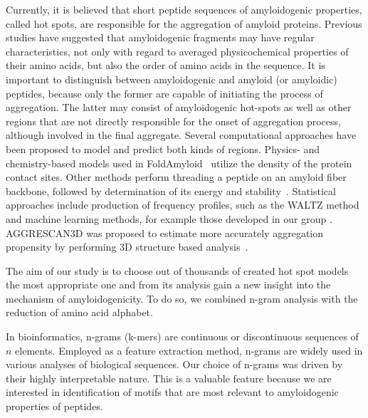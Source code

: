 \documentclass[fleqn,10pt,twoside]{gcb15submission}
\begin{document}
  Currently, it is believed that short peptide sequences of amyloidogenic 
properties, called hot spots, are responsible for the aggregation of amyloid 
proteins. Previous studies have suggested that amyloidogenic fragments may have 
regular characteristics, not only with regard to averaged physicochemical 
properties of their amino acids, but also the order of amino acids in the 
sequence. 
%
%
%
  It is important to distinguish between amyloidogenic and amyloid (or amyloidic) peptides, 
because only the former are capable of initiating the process of aggregation. The latter 
may consist of amyloidogenic hot-spots as well as other regions that are not directly responsible for the onset of aggregation process, although involved in the final aggregate. Several 
computational approaches have been proposed to model and predict both kinds of 
regions. Physics- and chemistry-based models used in  
FoldAmyloid~\citep{garbuzynskiy_foldamyloid:_2010} utilize the density of the 
protein contact sites. Other methods perform threading a peptide on an amyloid 
fiber backbone, followed by determination of its energy and 
stability~\citep{odonnell_method_2011}. Statistical approaches include production of frequency 
profiles, such as the WALTZ method \citep{beerten_waltz-db:_2015} and machine 
learning methods, for example those developed in our group 
\citep{stanislawski_machine_2013, gasior_fish_2014}. AGGRESCAN3D was 
proposed to estimate more accurately aggregation propensity by performing 3D 
structure based analysis~\citep{zambrano_aggrescan3d_2015}. 


%
%
%
  The aim of our study is to choose out of thousands of created hot spot 
models the most appropriate one and from its analysis gain a new insight into the 
mechanism of amyloidogenicity. To do so, we combined n-gram analysis with the
reduction of amino acid alphabet.
  
  In bioinformatics, n-grams (k-mers) are continuous or discontinuous sequences 
of $n$ elements. Employed as a feature extraction method, n-grams are widely 
used in various analyses of biological sequences. Our choice of n-grams was driven by 
their highly interpretable nature. This is a valuable feature because we are 
interested in identification of motifs that are most relevant to amyloidogenic 
properties of peptides.
\end{document}
